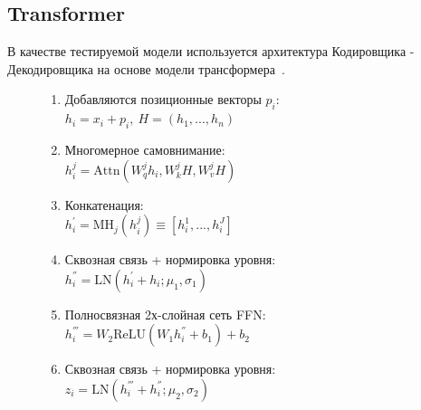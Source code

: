 \newpage

\subsection{Transformer}

В качестве тестируемой модели используется архитектура Кодировщика - Декодировщика на основе модели трансформера~\cite{Attention is all you need}.

\begin{figure}[H]
    \begin{minipage}{0.65\textwidth}  
        \begin{enumerate}
            \item Добавляются позиционные векторы $p_{i}$: \\
                $h_{i} = x_{i} + p_{i}, \ H = (h_{1}, ..., h_{n})$
            \item Многомерное самовнимание: \\
                $h_{i}^{j} = \text{Attn}(W_{q}^{j}h_{i}, W_{k}^{j}H, W_{v}^{j}H)$
            \item Конкатенация: \\
                $h_{i}^{'} = \text{MH}_{j}(h_{i}^{j}) \equiv [h_{i}^{1}, ..., h_{i}^{J}]$
            \item Сквозная связь + нормировка уровня: \\
                $h_{i}^{''} = \text{LN}(h_{i}^{'}+h_{i}; \mu_{1}, \sigma_{1})$
            \item Полносвязная 2х-слойная сеть FFN: \\
                $h_{i}^{'''} = W_{2}\text{ReLU}(W_{1}h_{i}^{''}+b_{1}) + b_{2}$
            \item Сквозная связь + нормировка уровня: \\
                $z_{i} = \text{LN}(h_{i}^{'''}+h_{i}^{''}; \mu_{2}, \sigma_{2})$
        \end{enumerate}
    \end{minipage}
    \centering
    \begin{minipage}{0.3\textwidth}
        \centering

\end{minipage}
\end{figure}
